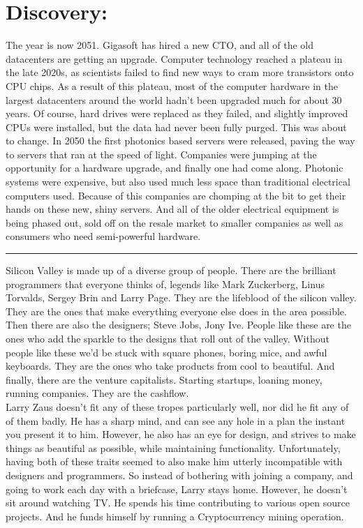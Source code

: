 \documentclass{article}
\newcommand{\breakline}{
\begin{center}
	\noindent\rule[0.5ex]{1in}{1pt}
\end{center}
}
\begin{document}
	\section{Discovery:}
		The year is now 2051. Gigasoft has hired a new CTO, and all of the old datacenters are getting an upgrade. Computer technology reached a plateau in the late 2020s, as scientists failed to find new ways to cram more transistors onto CPU chips. As a result of this plateau, most of the computer hardware in the largest datacenters around the world hadn't been upgraded much for about 30 years. Of course, hard drives were replaced as they failed, and slightly improved CPUs were installed, but the data had never been fully purged. This was about to change. In 2050 the first photonics based servers were released, paving the way to servers that ran at the speed of light. Companies were jumping at the opportunity for a hardware upgrade, and finally one had come along. Photonic systems were expensive, but also used much less space than traditional electrical computers used. Because of this companies are chomping at the bit to get their hands on these new, shiny servers. And all of the older electrical equipment is being phased out, sold off on the resale market to smaller companies as well as consumers who need semi-powerful hardware. \\
		\breakline
		Silicon Valley is made up of a diverse group of people. There are the brilliant programmers that everyone thinks of, legends like Mark Zuckerberg, Linus Torvalds, Sergey Brin and Larry Page. They are the lifeblood of the silicon valley. They are the ones that make everything everyone else does in the area possible. Then there are also the designers; Steve Jobs, Jony Ive. People like these are the ones who add the sparkle to the designs that roll out of the valley. Without people like these we'd be stuck with square phones, boring mice, and awful keyboards. They are the ones who take products from cool to beautiful. And finally, there are the venture capitalists. Starting startups, loaning money, running companies. They are the cashflow. \\
		
		Larry Zaus doesn't fit any of these tropes particularly well, nor did he fit any of of them badly. He has a sharp mind, and can see any hole in a plan the instant you present it to him. However, he also has an eye for design, and strives to make things as beautiful as possible, while maintaining functionality. Unfortunately, having both of these traits seemed to also make him utterly incompatible with designers and programmers. So instead of bothering with joining a company, and going to work each day with a briefcase, Larry stays home. However, he doesn't sit around watching TV. He spends his time contributing to various open source projects. And he funds himself by running a Cryptocurrency mining operation.\\
		
\end{document}
